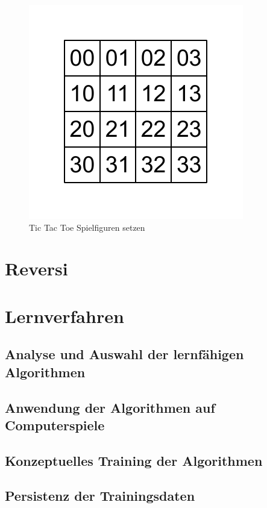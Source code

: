 \begin{figure}[!htbp]
  \centering
  \includegraphics[scale = 1]{inhalt/abbildungen/vier_mal_vier_matrix.pdf}
  \caption{Tic Tac Toe Spielfiguren setzen}
  \label{fig:kreiseUndKreuzeSetzen}
\end{figure}

\section{Reversi}

\section{Lernverfahren}
\label{sec:lernverfahren}
\subsection{Analyse und Auswahl der lernfähigen Algorithmen}

\subsection{Anwendung der Algorithmen auf Computerspiele}

\subsection{Konzeptuelles Training der Algorithmen}

\subsection{Persistenz der Trainingsdaten}